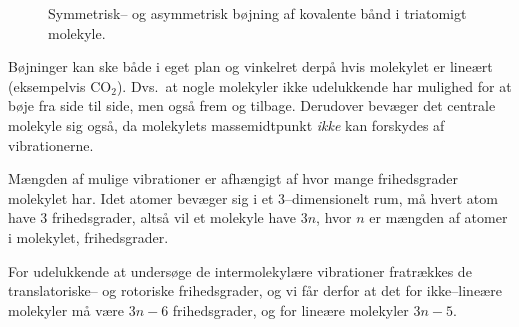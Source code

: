     \begin{figure}[H]
        \caption{Symmetrisk-- og asymmetrisk bøjning af kovalente bånd i triatomigt molekyle.}
    \end{figure}
    Bøjninger kan ske både i eget plan og vinkelret derpå hvis molekylet er lineært (eksempelvis CO$_2$). Dvs.\ at nogle molekyler ikke udelukkende har mulighed for at bøje fra side til side, men også frem og tilbage. Derudover bevæger det centrale molekyle sig også, da molekylets massemidtpunkt \textit{ikke} kan forskydes af vibrationerne.

    Mængden af mulige vibrationer er afhængigt af hvor mange frihedsgrader molekylet har. Idet atomer bevæger sig i et 3--dimensionelt rum, må hvert atom have 3 frihedsgrader, altså vil et molekyle have $3n$, hvor $n$ er mængden af atomer i molekylet, frihedsgrader.

    For udelukkende at undersøge de intermolekylære vibrationer fratrækkes de translatoriske-- og rotoriske frihedsgrader, og vi får derfor at det for ikke--lineære molekyler må være $3n-6$ frihedsgrader, og for lineære molekyler $3n-5$.

